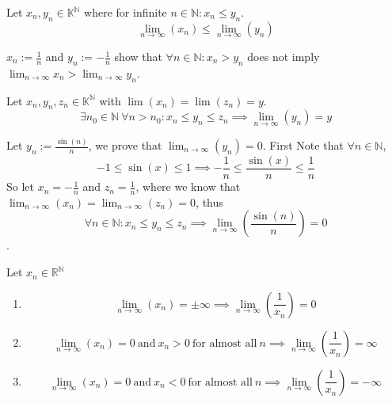 \begin{proposition}\label{pro:limit_comp}
   Let \(x_n, y_n \in \mathbb{K}^\mathbb{N}\) where for infinite \(n \in \mathbb{N}: x_n \leq y_n\).
   \[\lim_{n \to \infty}(x_n) \leq \lim_{n \to \infty}(y_n)\]
\end{proposition}
\begin{remark}
   \(x_n := \frac{1}{n}\) and \(y_n := -\frac{1}{n}\) show that \(\forall n \in \mathbb{N}: x_n > y_n\) does not imply \(\lim_{n \to \infty} x_n > \lim_{n \to \infty} y_n\).
\end{remark}

\begin{proposition}\label{pro:sandwich_seq}
   Let \(x_n, y_n, z_n \in \mathbb{K}^\mathbb{N}\) with \(\lim(x_n) = \lim(z_n) = y\).
   \[\exists n_0 \in \mathbb{N}~\forall n > n_0: x_n \leq y_n \leq z_n \implies \lim_{n \to \infty}(y_n) = y\]
\end{proposition}
\begin{example}
   Let \(y_n := \frac{\sin(n)}{n}\), we prove that \(\lim_{n \to \infty}(y_n) = 0\).
   First Note that \(\forall n \in \mathbb{N}\),
   \[-1 \leq \sin(x) \leq 1 \implies -\frac{1}{n} \leq \frac{\sin(x)}{n} \leq \frac{1}{n}\]
   So let \(x_n = -\frac{1}{n}\) and \(z_n = \frac{1}{n}\), where we know that \(\lim_{n \to \infty}(x_n) = \lim_{n \to \infty}(z_n) = 0\), thus
   \[\forall n \in \mathbb{N}: x_n \leq y_n \leq z_n \implies \lim_{n \to \infty}\left(\frac{\sin(n)}{n}\right) = 0\].
\end{example}

\begin{theorem}
   Let \(x_n \in \mathbb{R}^\mathbb{N}\)
   \begin{enumerate}[label=\roman*, align=Center]
      \item \[\lim_{n \to \infty}(x_n) = \pm\infty \implies \lim_{n \to \infty}\left(\frac{1}{x_n}\right) = 0\]
      \item \[\lim_{n \to \infty}(x_n) = 0~\text{and}~x_n > 0~\text{for almost all}~n \implies \lim_{n \to \infty}\left(\frac{1}{x_n}\right) = \infty\]
      \item \[\lim_{n \to \infty}(x_n) = 0~\text{and}~x_n < 0~\text{for almost all}~n \implies \lim_{n \to \infty}\left(\frac{1}{x_n}\right) = -\infty\]
   \end{enumerate}
\end{theorem}

\newpage

